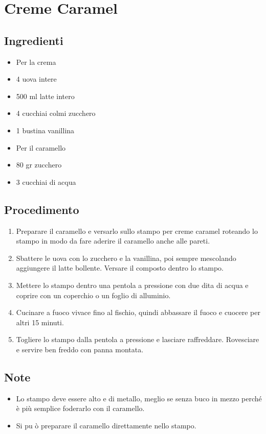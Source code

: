 \section{Creme Caramel}
\subsection{Ingredienti}
\begin{itemize}
\item Per la crema  
\item 4 uova intere  
\item 500 ml latte intero  
\item 4 cucchiai colmi zucchero  
\item 1 bustina vanillina  
\item Per il caramello  
\item 80 gr zucchero  
\item 3 cucchiai di acqua
\end{itemize}
\subsection{Procedimento}
\begin{enumerate}
\item  Preparare il caramello e versarlo sullo stampo per creme caramel roteando lo stampo in modo da fare aderire il caramello anche alle pareti.  
\item  Sbattere le uova con lo zucchero e la vanillina, poi sempre mescolando aggiungere il latte bollente. Versare il composto dentro lo stampo.  
\item  Mettere lo stampo dentro una pentola a pressione con due dita di acqua e coprire con un coperchio o un foglio di alluminio.  
\item  Cucinare a fuoco vivace fino al fischio, quindi abbassare il fuoco e cuocere per altri 15 minuti.  
\item  Togliere lo stampo dalla pentola a pressione e lasciare raffreddare. Rovesciare e servire ben freddo con panna montata.
\end{enumerate}
\subsection{Note}
\begin{itemize}
\item Lo stampo deve essere alto e di metallo, meglio se senza buco in mezzo perché è più semplice foderarlo con il caramello.  
\item Si pu ò preparare il caramello direttamente nello stampo.
\end{itemize}
